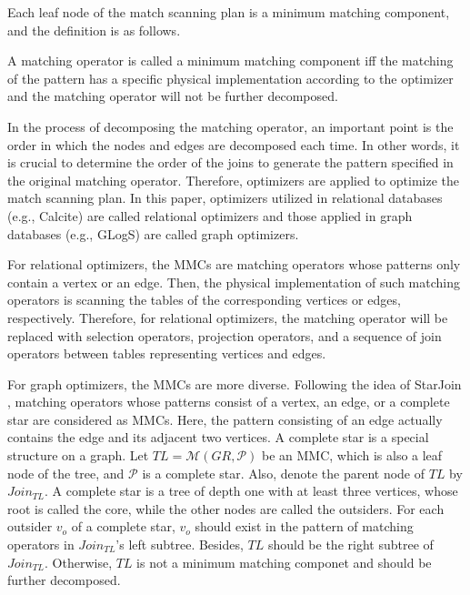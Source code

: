 Each leaf node of the match scanning plan is a minimum matching component, and the definition is as follows.

\begin{definition}
    A matching operator is called a minimum matching component iff the matching of the pattern has a specific physical implementation according to the optimizer and the matching operator will not be further decomposed.
\end{definition}

In the process of decomposing the matching operator, an important point is the order in which the nodes and edges are decomposed each time.
In other words, it is crucial to determine the order of the joins to generate the pattern specified in the original matching operator.
Therefore, optimizers are applied to optimize the match scanning plan.
In this paper, optimizers utilized in relational databases (e.g., Calcite) are called relational optimizers and those applied in graph databases (e.g., GLogS) are called graph optimizers.

For relational optimizers, the MMCs are matching operators whose patterns only contain a vertex or an edge.
Then, the physical implementation of such matching operators is scanning the tables of the corresponding vertices or edges, respectively.
Therefore, for relational optimizers, the matching operator will be replaced with selection operators, projection operators, and a sequence of join operators between tables representing vertices and edges.

For graph optimizers, the MMCs are more diverse.
Following the idea of StarJoin \cite{starjoin,huge}, matching operators whose patterns consist of a vertex, an edge, or a complete star are considered as MMCs.
Here, the pattern consisting of an edge actually contains the edge and its adjacent two vertices.
A complete star is a special structure on a graph.
Let $TL = \mathcal{M}(GR, \mathcal{P})$ be an MMC, which is also a leaf node of the tree, and $\mathcal{P}$ is a complete star.
Also, denote the parent node of $TL$ by $Join_{TL}$.
A complete star is a tree of depth one with at least three vertices, whose root is called the core, while the other nodes are called the outsiders.
For each outsider $v_o$ of a complete star, $v_o$ should exist in the pattern of matching operators in $Join_{TL}$'s left subtree.
Besides, $TL$ should be the right subtree of $Join_{TL}$.
Otherwise, $TL$ is not a minimum matching componet and should be further decomposed.

